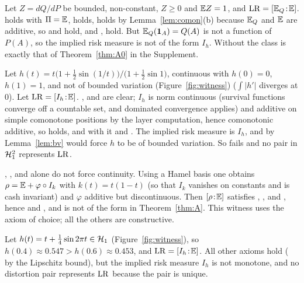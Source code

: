 \begin{example}
Let $Z=dQ/dP$ be bounded, non-constant, $Z\ge0$ and $\mathbb E Z=1$, and $\mathrm{LR}=[\mathbb E_Q\!:\!\mathbb E]$. \axP{} holds with
$\Pi=\mathbb E$, \axN{} holds, \axCM{} holds by Lemma~\ref{lem:comon}(b) because $\mathbb E_Q$ and $\mathbb E$ are additive, so \axPe{} and
\axR{} hold, and \axRM, \axRC{} hold. But $\mathbb E_Q(\mathbf 1_A)=Q(A)$ is not a function of $P(A)$, so the implied risk measure is not of the form
$I_h$. Without \axLI{} the class is exactly that of Theorem~\ref{thm:A0} in the Supplement.
\end{example}

\begin{example}
Let $h(t)=t\big(1+\tfrac12\sin(1/t)\big)/\big(1+\tfrac12\sin1\big)$, continuous with $h(0)=0$, $h(1)=1$, and not of
bounded variation (Figure~\ref{fig:witness}) ($\int|h'|$ diverges at $0$). Let $\mathrm{LR}=[I_h\!:\!\mathbb E]$. \axP, \axN{} and \axLI{} are clear;
$I_h$ is norm continuous (survival functions converge off a countable set, and dominated convergence applies)
and additive on simple comonotone positions by the layer computation, hence comonotonic additive, so \axCM{}
holds, and with it \axPe{} and \axR. The implied risk measure is $I_h$, and by Lemma~\ref{lem:bv} \axRC{} would force $h$ to be of bounded
variation. So \axRC{} fails and no pair in $\mathcal H_1^2$ represents $\mathrm{LR}$.
\end{example}

\begin{remark}
\axP, \axN, \axCM{} and \axLI{} alone do not force continuity. Using a Hamel basis one obtains
$\rho=\mathbb E+\varphi\circ I_k$ with $k(t)=t(1-t)$ (so that $I_k$ vanishes on constants and is cash invariant) and
$\varphi$ additive but discontinuous. Then $[\rho\!:\!\mathbb E]$ satisfies \axP, \axN, \axCM{} and \axLI, hence \axPe{} and \axR, and is not of
the form in Theorem~\ref{thm:A}. This witness uses the axiom of choice; all the others are constructive.
\end{remark}

\begin{example}
Let $h(t)=t+\tfrac14\sin2\pi t\in\mathcal H_1$ (Figure~\ref{fig:witness}), so $h(0.4)\approx0.547>h(0.6)\approx0.453$, and
$\mathrm{LR}=[I_h\!:\!\mathbb E]$. All other axioms hold (\axRC{} by the Lipschitz bound), but the implied risk measure
$I_h$ is not monotone, and no distortion pair represents $\mathrm{LR}$ because the pair is unique.
\end{example}

